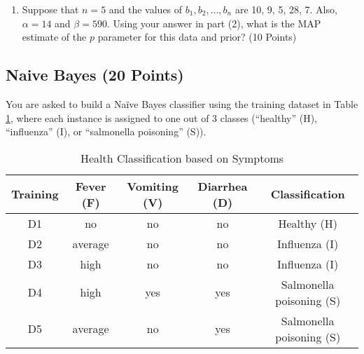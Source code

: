 \documentclass[a3paper,12pt]{article} %
\begin{document}
\begin{enumerate}
    (10 Points)

    \[
    \hat{p} = \arg\max_{0 < p \leq 1} \sum_{i=1}^n \log \left( (1 - p)^{b_i - 1} p \right) + \log \left( p^{\alpha - 1} (1 - p)^{\beta - 1} \right) - \log \left( \int p^{\alpha - 1} (1 - p)^{\beta - 1} dp \right)
    \]

    \[
    = \arg\max_{0 < p \leq 1} \sum_{i=1}^n \left( (b_i - 1) \log (1 - p) + \log p \right) + (\alpha - 1) \log p + (\beta - 1) \log (1 - p) - \log \left( \int p^{\alpha - 1} (1 - p)^{\beta - 1} dp \right)
    \]
    \[
    = \arg\max_{0 < p \leq 1} \sum_{i=1}^n (b_i - 1) \log (1 - p) + \sum_{i=1}^n \log p + (\alpha - 1) \log p + (\beta - 1) \log (1 - p) - \log \left( \int p^{\alpha - 1} (1 - p)^{\beta - 1} dp \right)
    \]

    \item Suppose that \( n = 5 \) and the values of \( b_1, b_2, \ldots, b_n \) are 10, 9, 5, 28, 7. Also, \( \alpha = 14 \) and \( \beta = 590 \). Using your answer in part (2), what is the MAP estimate of the \( p \) parameter for this data and prior? (10 Points)
\end{enumerate}

\subsection{Naive Bayes (20 Points)}
You are asked to build a Na\"ive Bayes classifier using the training dataset in Table \ref{tab:training_data}, where each instance is assigned to one out of 3 classes (“healthy” (H), “influenza” (I), or “salmonella poisoning” (S)).

\begin{table}[h]
\centering
\begin{tabular}{|c|c|c|c|c|}
\hline
Training &Fever (F) & Vomiting (V) & Diarrhea (D) & Classification \\
\hline
D1 & no & no & no & Healthy (H) \\
D2 & average & no & no & Influenza (I) \\
D3 & high & no & no & Influenza (I) \\
D4 & high & yes & yes & Salmonella poisoning (S) \\
D5 & average & no & yes & Salmonella poisoning (S) \\
\hline
\end{tabular}
\caption{Health Classification based on Symptoms}
\label{tab:training_data}
\end{table}
\end{document}
